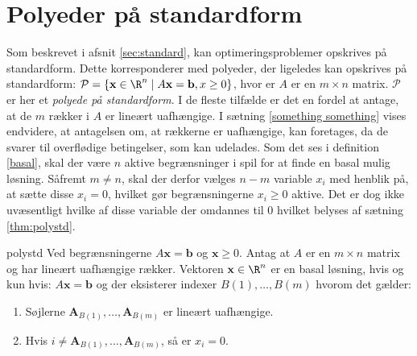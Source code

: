 \section{Polyeder på standardform}
\label{afsnit:fisk}
%
Som beskrevet i afsnit \ref{sec:standard}, kan optimeringsproblemer opskrives på standardform.
Dette korresponderer med polyeder, der ligeledes kan opskrives på standardform: 
$\mathcal{P}=\{ \mathbf{x} \in \R^n \mid A\mathbf{x}=\mathbf{b},x \geq 0 \}$, hvor er $A$ er en $m \times n$ matrix.
$\mathcal{P}$ er her et \textit{polyede på standardform}.
I de fleste tilfælde er det en fordel at antage, at de $m$ rækker i $A$ er lineært uafhængige.
I sætning \ref{something something} vises endvidere, at antagelsen om, at rækkerne er uafhængige, kan foretages, da de svarer til overflødige betingelser, som kan udelades.
Som det ses i definition \ref{basal}, skal der være $n$ aktive begrænsninger i spil for at finde en basal mulig løsning.
Såfremt $m \neq n$, skal der derfor vælges $n-m$ variable $x_i$ med henblik på, at sætte disse $x_i=0$, hvilket gør begrænsningerne $x_i \geq 0$ aktive.
Det er dog ikke uvæsentligt hvilke af disse variable der omdannes til $0$ hvilket belyses af sætning \ref{thm:polystd}.
%
\begin{thm}{}{polystd}
Ved begrænsningerne $A\mathbf{x}=\mathbf{b}$ og $\mathbf{x}\geq 0$.
Antag at $A$ er en $m \times n$ matrix og har lineært uafhængige rækker.
Vektoren $\mathbf{x} \in \R^n$ er en basal løsning, hvis og kun hvis: $A\mathbf{x}=\mathbf{b}$ og der eksisterer indexer $B(1),\ldots,B(m)$ hvorom det gælder:
\begin{enumerate}[label=(\alph*)]
\item Søjlerne $\mathbf{A}_{B(1)},\ldots,\mathbf{A}_{B(m)}$ er lineært uafhængige.
\item Hvis $i \neq \mathbf{A}_{B(1)},\ldots,\mathbf{A}_{B(m)}$, så er $x_i=0$.
\end{enumerate}
\end{thm}

